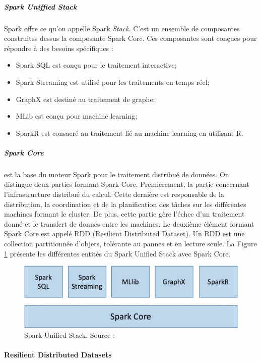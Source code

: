 \subparagraph{Spark Uniffied Stack} \label{Spark Uniffied-Stack}Spark offre ce qu'on appelle Spark \textit{Stack}. C'est un ensemble de composantes construites dessus la composante Spark Core.  Ces composantes sont conçues pour répondre à des besoins spécifiques :
\begin{itemize}
	\item Spark SQL  est conçu pour le traitement interactive;
	\item Spark Streaming est utilisé pour les traitements en temps réel;
	\item  GraphX est destiné au traitement de graphe;
	\item MLib est conçu pour  machine learning;
	\item SparkR est consacré au traitement lié au machine learning en utilisant  R.
	
\end{itemize}

\subparagraph{Spark Core} est la base du moteur Spark pour le traitement distribué de données.  On distingue deux parties formant Spark Core. Premièrement, la partie concernant l'infrastructure distribué du calcul. Cette dernière est responsable de la distribution, la coordination et de la planification des tâches  sur les différentes machines formant le cluster. De plus, cette partie gère l'échec d'un traitement donné et le transfert de donnés entre les machines. Le deuxième élément formant Spark Core est appelé RDD (Resilient Distributed Dataset). Un RDD est une collection partitionnée d'objets, tolérante au pannes et en lecture seule. 
La Figure \ref{fig:unified-stack}  présente les différentes entités du Spark Unified Stack avec Spark Core.

\begin{figure}[H]
	\centering
	\captionsetup{justification=centering}
	\includegraphics[width=0.7\linewidth]{illustrations/unified-stack}
	\caption{ Spark Unified Stack. Source : \cite{eginning-Apache-Spark-2-unified-stack}}
	\label{fig:unified-stack}
\end{figure}

\paragraph{Resilient Distributed Datasets}~


